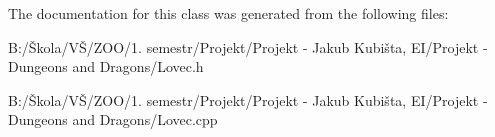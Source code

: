 The documentation for this class was generated from the following files\-:\begin{DoxyCompactItemize}
\item 
B\-:/Škola/\-VŠ/\-Z\-O\-O/1. semestr/\-Projekt/\-Projekt -\/ Jakub Kubišta, E\-I/\-Projekt -\/ Dungeons and Dragons/Lovec.\-h\item 
B\-:/Škola/\-VŠ/\-Z\-O\-O/1. semestr/\-Projekt/\-Projekt -\/ Jakub Kubišta, E\-I/\-Projekt -\/ Dungeons and Dragons/Lovec.\-cpp\end{DoxyCompactItemize}
